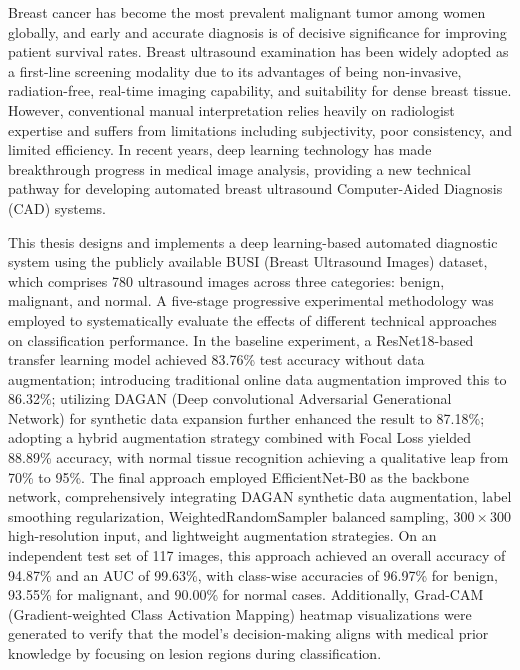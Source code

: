 \abstracten

Breast cancer has become the most prevalent malignant tumor among women globally, and early and accurate diagnosis is of decisive significance for improving patient survival rates. Breast ultrasound examination has been widely adopted as a first-line screening modality due to its advantages of being non-invasive, radiation-free, real-time imaging capability, and suitability for dense breast tissue. However, conventional manual interpretation relies heavily on radiologist expertise and suffers from limitations including subjectivity, poor consistency, and limited efficiency. In recent years, deep learning technology has made breakthrough progress in medical image analysis, providing a new technical pathway for developing automated breast ultrasound Computer-Aided Diagnosis (CAD) systems.

This thesis designs and implements a deep learning-based automated diagnostic system using the publicly available BUSI (Breast Ultrasound Images) dataset, which comprises 780 ultrasound images across three categories: benign, malignant, and normal. A five-stage progressive experimental methodology was employed to systematically evaluate the effects of different technical approaches on classification performance. In the baseline experiment, a ResNet18-based transfer learning model achieved 83.76\% test accuracy without data augmentation; introducing traditional online data augmentation improved this to 86.32\%; utilizing DAGAN (Deep convolutional Adversarial Generational Network) for synthetic data expansion further enhanced the result to 87.18\%; adopting a hybrid augmentation strategy combined with Focal Loss yielded 88.89\% accuracy, with normal tissue recognition achieving a qualitative leap from 70\% to 95\%. The final approach employed EfficientNet-B0 as the backbone network, comprehensively integrating DAGAN synthetic data augmentation, label smoothing regularization, WeightedRandomSampler balanced sampling, $300\times300$ high-resolution input, and lightweight augmentation strategies. On an independent test set of 117 images, this approach achieved an overall accuracy of 94.87\% and an AUC of 99.63\%, with class-wise accuracies of 96.97\% for benign, 93.55\% for malignant, and 90.00\% for normal cases. Additionally, Grad-CAM (Gradient-weighted Class Activation Mapping) heatmap visualizations were generated to verify that the model's decision-making aligns with medical prior knowledge by focusing on lesion regions during classification.

